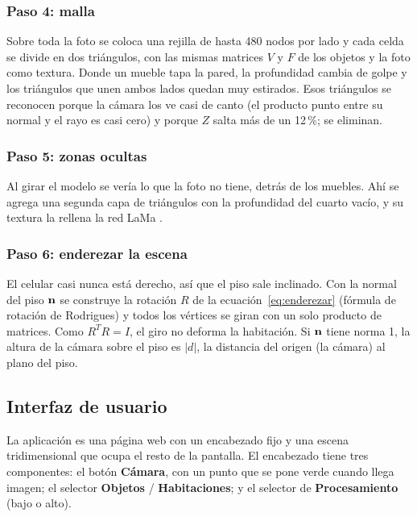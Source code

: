 

\subsubsection{Paso 4: malla}

Sobre toda la foto se coloca una rejilla de hasta
480 nodos por lado y cada celda se divide en dos triángulos, con las mismas
matrices $V$ y $F$ de los objetos y la foto como textura. Donde un mueble tapa
la pared, la profundidad cambia de golpe y los triángulos que unen ambos lados
quedan muy estirados. Esos triángulos se reconocen porque la cámara los ve
casi de canto (el producto punto entre su normal y el rayo es casi cero) y
porque $Z$ salta más de un 12\,\%; se eliminan.




\subsubsection{Paso 5: zonas ocultas}

Al girar el modelo se vería lo que la foto
no tiene, detrás de los muebles. Ahí se agrega una segunda capa de triángulos
con la profundidad del cuarto vacío, y su textura la rellena la red LaMa
\citep{suvorov2022}.




\subsubsection{Paso 6: enderezar la escena}

El celular casi nunca está derecho,
así que el piso sale inclinado. Con la normal del piso $\mathbf{n}$ se construye
la rotación $R$ de la ecuación~\eqref{eq:enderezar} (fórmula de rotación de
Rodrigues) y todos los vértices se giran con un solo producto de matrices. Como
$R^{T}R=I$, el giro no deforma la habitación. Si $\mathbf{n}$ tiene norma 1, la
altura de la cámara sobre el piso es $|d|$, la distancia del origen (la
cámara) al plano del piso.



\subsection{Interfaz de usuario}

La aplicación es una página web con un encabezado fijo y una escena
tridimensional que ocupa el resto de la pantalla. El encabezado tiene tres
componentes: el botón \textbf{Cámara}, con un punto que se pone verde cuando
llega imagen; el selector \textbf{Objetos} / \textbf{Habitaciones}; y el
selector de \textbf{Procesamiento} (bajo o alto).

